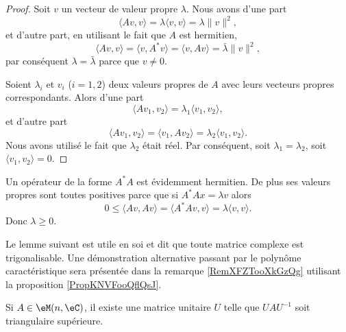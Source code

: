 \begin{proof}
    Soit \( v\) un vecteur de valeur propre \( \lambda\). Nous avons d'une part 
    \begin{equation}
        \langle Av, v\rangle =\lambda\langle v, v\rangle =\lambda\| v \|^2,
    \end{equation}
    et d'autre part, en utilisant le fait que \( A\) est hermitien,
    \begin{equation}
        \langle Av, v\rangle =\langle v, A^*v\rangle =\langle v, Av\rangle =\bar\lambda\| v \|^2,
    \end{equation}
    par conséquent \( \lambda=\bar\lambda\) parce que \( v\neq 0\).

    Soient \( \lambda_i\) et \( v_i\) (\( i=1,2\)) deux valeurs propres de \( A\) avec leurs vecteurs propres correspondants. Alors d'une part
    \begin{equation}
        \langle Av_1, v_2\rangle =\lambda_1\langle v_1, v_2\rangle ,
    \end{equation}
    et d'autre part
    \begin{equation}
        \langle Av_1, v_2\rangle =\langle v_1, Av_2\rangle =\lambda_2\langle v_1, v_2\rangle .
    \end{equation}
    Nous avons utilisé le fait que \( \lambda_2\) était réel. Par conséquent, soit \( \lambda_1=\lambda_2\), soit \( \langle v_1, v_2\rangle =0\).
\end{proof}

\begin{remark}      \label{REMooMLBCooTuKFmz}
    Un opérateur de la forme \( A^*A\) est évidemment hermitien. De plus ses valeurs propres sont toutes positives parce que si \( A^*Ax=\lambda v\) alors
    \begin{equation}
        0\leq \langle Av, Av\rangle =\langle A^*Av, v\rangle =\lambda\langle v, v\rangle .
    \end{equation}
    Donc \( \lambda\geq 0\).
\end{remark}

Le lemme suivant est utile en soi et dit que toute matrice complexe est trigonalisable. Une démonstration alternative passant par le polynôme caractéristique sera présentée dans la remarque \ref{RemXFZTooXkGzQg} utilisant la proposition \ref{PropKNVFooQflQsJ}.
\begin{lemma}  \label{LemSchurComplHAftTq}
    Si \( A\in\eM(n,\eC)\), il existe une matrice unitaire \( U\) telle que \( UAU^{-1}\) soit triangulaire supérieure.
\end{lemma}

